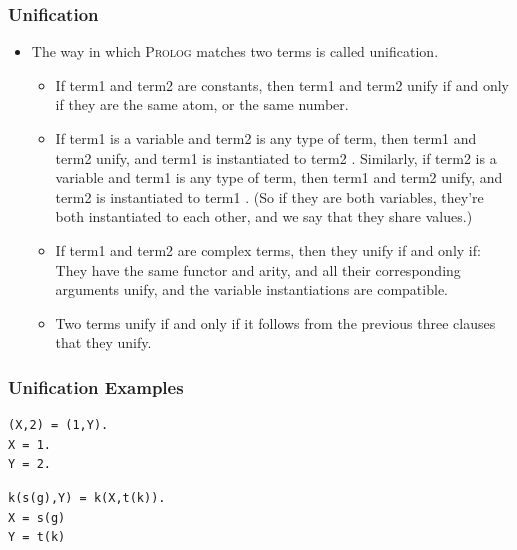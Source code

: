 \documentclass[hideothersubsections, t, aspectratio=1610]{beamer}
\newcommand{\progLang}[1]{\textsc{#1}}
\begin{document}
\begin{frame}
\frametitle{Unification}
\begin{itemize}
\item The way in which \progLang{Prolog} matches two terms is called unification. 
\begin{itemize}
\item If term1 and term2 are constants, then term1 and term2 unify if and only if they are the same atom, or the same number.

\item If term1 is a variable and term2 is any type of term, then term1 and term2 unify, and term1 is instantiated to term2 . Similarly, if term2 is a variable and term1 is any type of term, then term1 and term2 unify, and term2 is instantiated to term1 . (So if they are both variables, they’re both instantiated to each other, and we say that they share values.)

\item If term1 and term2 are complex terms, then they unify if and only if:
They have the same functor and arity, and
all their corresponding arguments unify, and
the variable instantiations are compatible.

\item Two terms unify if and only if it follows from the previous three clauses that they unify.
\end{itemize}

\end{itemize}
\end{frame}

\begin{frame}[fragile]
\frametitle{Unification Examples}

\begin{verbatim}
(X,2) = (1,Y).
X = 1.
Y = 2. 
\end{verbatim}
\begin{verbatim}
k(s(g),Y) = k(X,t(k)).
X = s(g)
Y = t(k)
\end{verbatim}

\end{frame}



\end{document}
